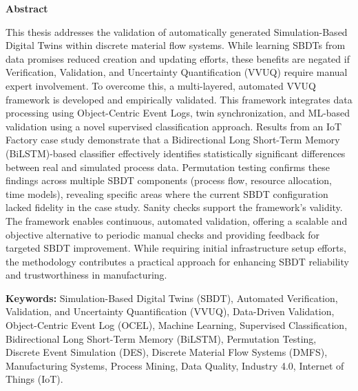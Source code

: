 \thispagestyle{plain} %

\vspace*{1.5in} %

\begin{center}
  {\Large \textbf{Abstract}}
\end{center}

This thesis addresses the validation of automatically generated Simulation-Based Digital Twins within discrete material flow systems. While learning SBDTs from data promises reduced creation and updating efforts, these benefits are negated if Verification, Validation, and Uncertainty Quantification (VVUQ) require manual expert involvement. To overcome this, a multi-layered, automated VVUQ framework is developed and empirically validated. This framework integrates data processing using Object-Centric Event Logs, twin synchronization, and ML-based validation using a novel supervised classification approach. Results from an IoT Factory case study demonstrate that a Bidirectional Long Short-Term Memory (BiLSTM)-based classifier effectively identifies statistically significant differences between real and simulated process data. Permutation testing confirms these findings across multiple SBDT components (process flow, resource allocation, time models), revealing specific areas where the current SBDT configuration lacked fidelity in the case study. Sanity checks support the framework's validity. The framework enables continuous, automated validation, offering a scalable and objective alternative to periodic manual checks and providing feedback for targeted SBDT improvement. While requiring initial infrastructure setup efforts, the methodology contributes a practical approach for enhancing SBDT reliability and trustworthiness in manufacturing.

\vspace{0.3in}

\textbf{Keywords:} Simulation-Based Digital Twins (SBDT), Automated Verification, Validation, and Uncertainty Quantification (VVUQ), Data-Driven Validation, Object-Centric Event Log (OCEL), Machine Learning, Supervised Classification, Bidirectional Long Short-Term Memory (BiLSTM), Permutation Testing, Discrete Event Simulation (DES), Discrete Material Flow Systems (DMFS), Manufacturing Systems, Process Mining, Data Quality, Industry 4.0, Internet of Things (IoT).

\clearpage